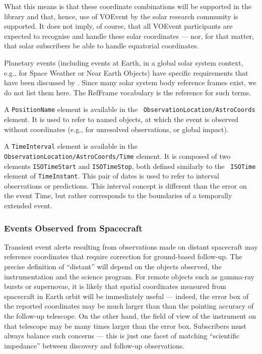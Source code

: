 \documentclass[11pt,a4paper]{ivoa}
\begin{document}
What this means is that these coordinate combinations will be supported in the 
library and that, hence, use of VOEvent by the solar research community is 
supported. It does not imply, of course, that all VOEvent participants are 
expected to recognise and handle these solar coordinates --- nor, for that 
matter, that solar subscribers be able to handle equatorial coordinates. 

Planetary events (including events at Earth, in a global solar system context,
e.g., for Space Weather or Near Earth Objects) have specific requirements that 
have been discussed by \citet{2018arXiv181112680C}. Since many solar system body 
reference frames exist, we do not list them here. The RefFrame vocabulary is the 
reference for such terms.

A {\tt PositionName} element is available in the {\tt 
ObservationLocation/AstroCoords} element. It is used to refer to named objects, 
at which the event is observed without coordinates (e.g., for unresolved 
observations, or global impact).  

A {\tt TimeInterval} element is available in the {\tt 
ObservationLocation/AstroCoords/Time} element. It is composed of two elements 
{\tt ISOTimeStart} and {\tt ISOTimeStop}, both defined similarly to the {\tt 
ISOTime} element of {\tt TimeInstant}. This pair of dates is used to refer to 
interval observations or predictions. This interval concept is different than 
the error on the event Time, but rather corresponds to the boundaries of a 
temporally extended event. 


\subsubsection{Events Observed from Spacecraft}
\label{sec:3.4.5}
Transient event alerts resulting from observations made on distant spacecraft 
may reference coordinates that require correction for ground-based follow-up. 
The precise definition of ``distant'' will depend on the objects observed, the 
instrumentation and the science program. For remote objects such as gamma-ray 
bursts or supernovae, it is likely that spatial coordinates measured from 
spacecraft in Earth orbit will be immediately useful --- indeed, the error box 
of the reported coordinates may be much larger than than the pointing accuracy 
of the follow-up telescope. On the other hand, the field of view of the 
instrument on that telescope may be many times larger than the error box. 
Subscribers must always balance such concerns --- this is just one facet of 
matching ``scientific impedance'' between discovery and follow-up observations. 
\end{document}
